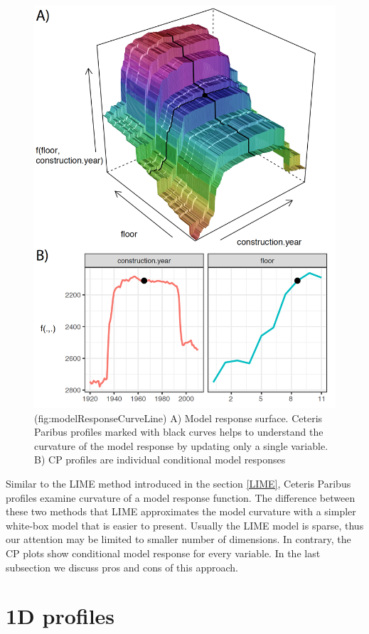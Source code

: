 \documentclass[]{book}
\theoremstyle{definition}
\theoremstyle{definition}
\theoremstyle{definition}
\theoremstyle{remark}
\begin{document}
\begin{figure}

{\centering \includegraphics[width=0.7\linewidth]{figure/model_response_line} 

}

\caption{(fig:modelResponseCurveLine) A) Model response surface. Ceteris Paribus profiles marked with black curves helps to understand the curvature of the model response by updating only a single variable. B) CP profiles are individual conditional model responses}\label{fig:modelResponseCurveLine}
\end{figure}

Similar to the LIME method introduced in the section \ref{LIME}, Ceteris
Paribus profiles examine curvature of a model response function. The
difference between these two methods that LIME approximates the model
curvature with a simpler white-box model that is easier to present.
Usually the LIME model is sparse, thus our attention may be limited to
smaller number of dimensions. In contrary, the CP plots show conditional
model response for every variable. In the last subsection we discuss
pros and cons of this approach.

\hypertarget{ceterisParibus1d}{%
\section{1D profiles}\label{ceterisParibus1d}}
\end{document}

